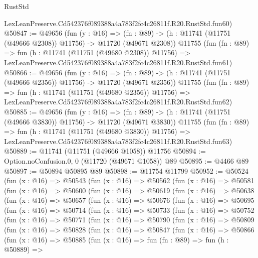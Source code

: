\begin{lexlean}{RustStd}
\begin{coremodule}
    LexLeanPreserve.Cd542376f089388a4a783f2fc4c26811f.R20.RustStd.fun60)
@50847 := @49656
    (fun (y : @16) =>
    (fn : @89) -> (h : @11741 (@11751 (@49666 @2308)) @11756) -> @11720 (@49671 @2308))
    @11755
    (fun (fn : @89) =>
    fun (h : @11741 (@11751 (@49680 @2308)) @11756) =>
    LexLeanPreserve.Cd542376f089388a4a783f2fc4c26811f.R20.RustStd.fun61)
@50866 := @49656
    (fun (y : @16) =>
    (fn : @89) -> (h : @11741 (@11751 (@49666 @2356)) @11756) -> @11720 (@49671 @2356))
    @11755
    (fun (fn : @89) =>
    fun (h : @11741 (@11751 (@49680 @2356)) @11756) =>
    LexLeanPreserve.Cd542376f089388a4a783f2fc4c26811f.R20.RustStd.fun62)
@50885 := @49656
    (fun (y : @16) =>
    (fn : @89) -> (h : @11741 (@11751 (@49666 @3830)) @11756) -> @11720 (@49671 @3830))
    @11755
    (fun (fn : @89) =>
    fun (h : @11741 (@11751 (@49680 @3830)) @11756) =>
    LexLeanPreserve.Cd542376f089388a4a783f2fc4c26811f.R20.RustStd.fun63)
@50889 := @11741 (@11751 (@49666 @1058)) @11756
@50894 := Option.noConfusion.{0, 0} (@11720 (@49671 @1058)) @89
@50895 := @4466 @89
@50897 := @50894 @50895 @89
@50898 := @11754 @11799
@50952 := @50524
    (fun (x : @16) =>
    @50543
      (fun (x : @16) =>
      @50562
        (fun (x : @16) =>
        @50581
          (fun (x : @16) =>
          @50600
            (fun (x : @16) =>
            @50619
              (fun (x : @16) =>
              @50638
                (fun (x : @16) =>
                @50657
                  (fun (x : @16) =>
                  @50676
                    (fun (x : @16) =>
                    @50695
                      (fun (x : @16) =>
                      @50714
                        (fun (x : @16) =>
                        @50733
                          (fun (x : @16) =>
                          @50752
                            (fun (x : @16) =>
                            @50771
                              (fun (x : @16) =>
                              @50790
                                (fun (x : @16) =>
                                @50809
                                  (fun (x : @16) =>
                                  @50828
                                    (fun (x : @16) =>
                                    @50847
                                      (fun (x : @16) =>
                                      @50866
                                        (fun (x : @16) =>
                                        @50885
                                          (fun (x : @16) =>
                                          fun (fn : @89) =>
                                          fun (h : @50889) =>

\end{coremodule}
\end{lexlean}
